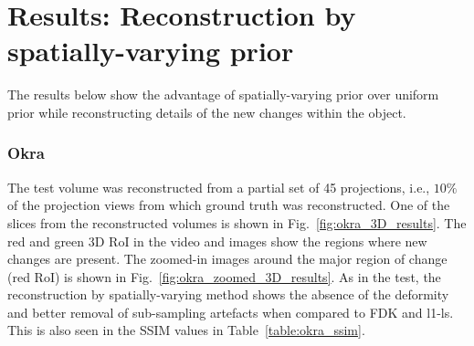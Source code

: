 \documentclass[journal]{IEEEtran}
\begin{document}
\section{Results: Reconstruction by spatially-varying prior}
\label{sec:results_spatially_varying_prior}

The results below show the advantage of spatially-varying prior over uniform prior while reconstructing details of the new changes within the object.

\subsubsection{\textbf{Okra}}
\label{Sec:okra_spatially_varying}
The test volume was reconstructed from a partial set of
45 projections, i.e., $10\%$ of the projection views from which ground
truth was reconstructed. One of the slices from the reconstructed volumes 
is shown in Fig.~\ref{fig:okra_3D_results}. The red and green 3D
RoI in the video and images show the regions where new changes are
present. The zoomed-in images around the major region of change (red
RoI) is shown in Fig.~\ref{fig:okra_zoomed_3D_results}. As in the
test, the reconstruction by spatially-varying method shows the absence
of the deformity and better removal of sub-sampling artefacts when
compared to FDK and l1-ls. This is also seen in the SSIM values in
Table~\ref{table:okra_ssim}.
\end{document}
